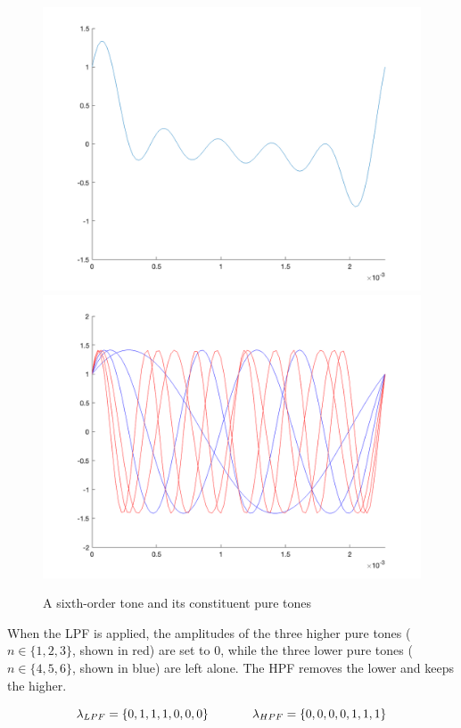 \begin{figure}[h]
    \centering
    \includegraphics[scale=.15]{6th_order_tone.png}
    \includegraphics[scale=.15]{6th_order_tone_cluster.png}
    \caption{A sixth-order tone and its constituent pure tones}
    \label{fig:5th_order_tone}
\end{figure}

\par \bigskip When the LPF is applied, the amplitudes of the three higher pure tones ($n\in\{1,2,3\}$, shown in red) are set to 0, while the three lower pure tones ($n\in\{4,5,6\}$, shown in blue) are left alone. The HPF removes the lower and keeps the higher.


$$\lambda_{LPF} = \{0,1,1,1,0,0,0\} \hspace{.5in} \lambda_{HPF} = \{0,0,0,0,1,1,1\}$$


